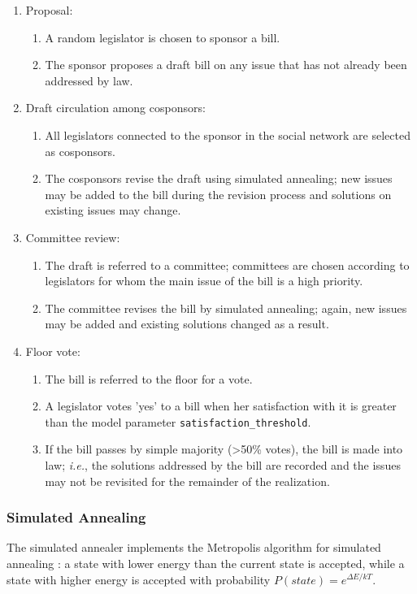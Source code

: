 \documentclass[pdftex,12pt]{llncs}
\begin{document}
\begin{enumerate}
  \item Proposal:
  \begin{enumerate}
    \item A random legislator is chosen to sponsor a bill.
    \item The sponsor proposes a draft bill on any issue that has not already been addressed by law.
  \end{enumerate}
  \item Draft circulation among cosponsors:
  \begin{enumerate}
    \item All legislators connected to the sponsor in the social network are selected as cosponsors.
    \item The cosponsors revise the draft using simulated annealing; new issues may be added to the bill during the revision process and solutions on existing issues may change.
  \end{enumerate}
  \item Committee review:
  \begin{enumerate}
    \item The draft is referred to a committee; committees are chosen according to legislators for whom the main issue of the bill is a high priority.
    \item The committee revises the bill by simulated annealing; again, new issues may be added and existing solutions changed as a result.
  \end{enumerate} 
  \item Floor vote:
    \begin{enumerate}
    \item The bill is referred to the floor for a vote.
    \item A legislator votes 'yes' to a bill when her satisfaction with it is greater than the model parameter \texttt{satisfaction\_threshold}.
    \item If the bill passes by simple majority (\textgreater 50\% votes), the bill is made into law; \textit{i.e.}, the solutions addressed by the bill are recorded and the issues may not be revisited for the remainder of the realization.
  \end{enumerate} 
\end{enumerate} 

\subsubsection{Simulated Annealing}
The simulated annealer implements the Metropolis algorithm for simulated annealing \parencite{mrrt53, kgv}: a state with lower energy than the current state is accepted, while a state with higher energy is accepted with probability $P(state) = e^{\Delta E/kT}$.  
\end{document}

